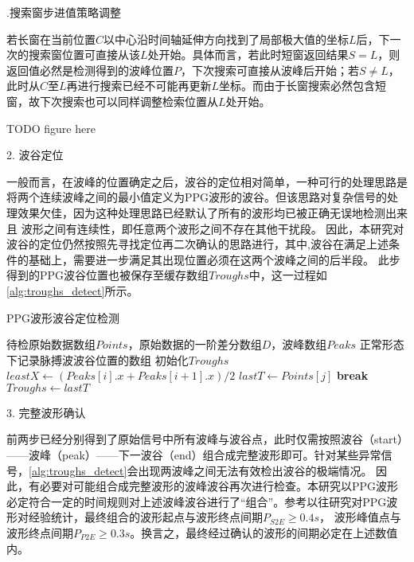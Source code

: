 .搜索窗步进值策略调整

若长窗在当前位置$C$以中心沿时间轴延伸方向找到了局部极大值的坐标$L$后，下一次的搜索窗位置可直接从该$L$处开始。具体而言，若此时短窗返回结果$S=L$，则返回值必然是检测得到的波峰位置$P$，下次搜索可直接从波峰后开始；若$S\ne L$，
此时从$C$至$L$再进行搜索已经不可能再更新$L$坐标。而由于长窗搜索必然包含短窗，故下次搜索也可以同样调整检索位置从$L$处开始。

TODO 
figure here

2. 波谷定位

一般而言，在波峰的位置确定之后，波谷的定位相对简单，一种可行的处理思路是将两个连续波峰之间的最小值定义为PPG波形的波谷。但该思路对复杂信号的处理效果欠佳，因为这种处理思路已经默认了所有的波形均已被正确无误地检测出来且
波形之间有连续性，即任意两个波形之间不存在其他干扰段。
因此，本研究对波谷的定位仍然按照先寻找定位再二次确认的思路进行，其中,波谷在满足上述条件的基础上，需要进一步满足其出现位置必须在这两个波峰之间的后半段。
此步得到的PPG波谷位置也被保存至缓存数组$Troughs$中，这一过程如\autoref{alg:troughs_detect}所示。
\begin{breakablealgorithm}
    \caption{PPG波形波谷定位检测}
    \label{alg:troughs_detect}
    \begin{algorithmic}[1] %
        \Require 待检原始数据数组$Points$，原始数据的一阶差分数组$D$，波峰数组$Peaks$
        \Ensure 正常形态下记录脉搏波波谷位置的数组
            \State 初始化$Troughs$
                \State $leastX \gets (Peaks[i].x + Peaks[i+1].x )/2$
                            \State $lastT \gets Points[j]$
                            \State \textbf{break}
                        \EndIf
                    \EndFor
                \State $Troughs \gets lastT$
            \EndFor
            \State {}
        \EndFunction
    \end{algorithmic}
\end{breakablealgorithm}

3. 完整波形确认

前两步已经分别得到了原始信号中所有波峰与波谷点，此时仅需按照波谷（start）——波峰（peak）——下一波谷（end）组合成完整波形即可。针对某些异常信号，\autoref{alg:troughs_detect}会出现两波峰之间无法有效检出波谷的极端情况。
因此，有必要对可能组合成完整波形的波峰波谷再次进行检查。本研究以PPG波形必定符合一定的时间规则对上述波峰波谷进行了“组合”。参考以往研究对PPG波形对经验统计，最终组合的波形起点与波形终点间期$P_{S2E}\ge 0.4s$，
波形峰值点与波形终点间期$P_{P2E}\ge 0.3s$。换言之，最终经过确认的波形的间期必定在上述数值内。

